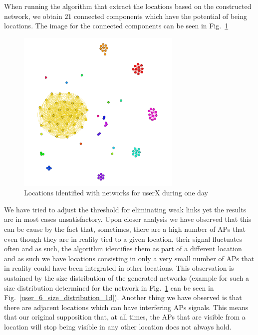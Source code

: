 When running the algorithm that extract the locations based on the constructed
network, we obtain $21$ connected components which have the potential of being
locations. The image for the connected components can be seen in
Fig.~\ref{user_6_networks_1d} 

\begin{figure}[!h]
\centering
\includegraphics[width=0.7\textwidth]{figures/networks/user_6_day0_networks.png}
\caption{Locations identified with networks for userX during one day}
\label{user_6_networks_1d}
\end{figure}

We have tried to adjust the threshold for eliminating weak links yet the results
are in most cases unsatisfactory. Upon closer analysis we have observed that
this can be cause by the fact that, sometimes, there are a high number of APs
that even though they are in reality tied to a given location, their signal
fluctuates often and as such, the algorithm identifies them as part of a
different location and as such we have locations consisting in only a very small
number of APs that in reality could have been integrated in other locations.
This observation is sustained by the size distribution of the generated networks
(example for such a size distribution determined for the network in
Fig.~\ref{user_6_networks_1d} can be seen in
Fig.~\ref{user_6_size_distribution_1d}). Another thing we have observed is that
there are adjacent locations which can have interfering APs signals. This means
that our original supposition that, at all times, the APs that are visible from
a location will stop being visible in any other location does not always hold.

